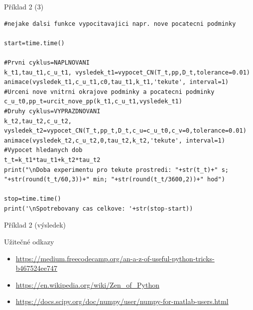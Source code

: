 \documentclass[10pt]{beamer}
\begin{document}
\begin{frame}[fragile]{Příklad 2 (3)}
\begin{lstlisting}[columns=flexible]
#nejake dalsi funkce vypocitavajici napr. nove pocatecni podminky

start=time.time()

#Prvni cyklus=NAPLNOVANI
k_t1,tau_t1,c_u_t1, vysledek_t1=vypocet_CN(T_t,pp,D_t,tolerance=0.01)
animace(vysledek_t1,c_u_t1,c0,tau_t1,k_t1,'tekute', interval=1)
#Urceni nove vnitrni okrajove podminky a pocatecni podminky
c_u_t0,pp_t=urcit_nove_pp(k_t1,c_u_t1,vysledek_t1)
#Druhy cyklus=VYPRAZDNOVANI
k_t2,tau_t2,c_u_t2, vysledek_t2=vypocet_CN(T_t,pp_t,D_t,c_u=c_u_t0,c_v=0,tolerance=0.01)
animace(vysledek_t2,c_u_t2,0,tau_t2,k_t2,'tekute', interval=1)
#Vypocet hledanych dob
t_t=k_t1*tau_t1+k_t2*tau_t2
print("\nDoba experimentu pro tekute prostredi: "+str(t_t)+" s; "+str(round(t_t/60,3))+" min; "+str(round(t_t/3600,2))+" hod")

stop=time.time()
print('\nSpotrebovany cas celkove: '+str(stop-start))
\end{lstlisting}
\end{frame}

\begin{frame}{Příklad 2 (výsledek)}
    \centering
\end{frame}


\begin{frame}{Užitečné odkazy}
    \begin{itemize}
        \item \url{https://medium.freecodecamp.org/an-a-z-of-useful-python-tricks-b467524ee747}
        \item \url{https://en.wikipedia.org/wiki/Zen_of_Python}
        \item \url{https://docs.scipy.org/doc/numpy/user/numpy-for-matlab-users.html}
    \end{itemize}
\end{frame}
\end{document}
